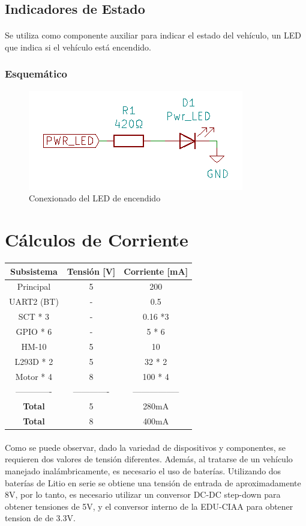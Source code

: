 \subsection{Indicadores de Estado}

\paragraph{}Se utiliza como componente auxiliar para indicar el estado del vehículo, un LED que indica si el vehículo está encendido.

\subsubsection{Esquemático}

\begin{figure}[H]
	\centering
	\includegraphics[width=0.4\linewidth]{informe_3/schem_pwr_led.png}
	\caption{Conexionado del LED de encendido}
	\label{fig:schempwrled}
\end{figure}

\section{Cálculos de Corriente}

\begin{longtable}[]{|c|c|c|}
	\toprule
	Subsistema & Tensión {[}V{]} & Corriente {[}mA{]}\tabularnewline
	\midrule
	\endhead
	Principal & 5 & 200\tabularnewline
	UART2 (BT) & - & 0.5\tabularnewline
	SCT * 3 & - & 0.16 *3\tabularnewline
	GPIO * 6 & - & 5 * 6\tabularnewline
	HM-10 & 5 & 10\tabularnewline
	L293D * 2 & 5 & 32 * 2\tabularnewline
	Motor * 4 & 8 & 100 * 4\tabularnewline
	------------- & ------------- & -----------------\tabularnewline
	\textbf{Total} & 5 & 280mA\tabularnewline
	\textbf{Total} & 8 & 400mA\tabularnewline
	\bottomrule
\end{longtable}

\paragraph{}Como se puede observar, dado la variedad de dispositivos y componentes,
se requieren dos valores de tensión diferentes. Además, al tratarse de un vehículo
manejado inalámbricamente, es necesario el uso de baterías. Utilizando dos baterías de Litio en serie 
se obtiene una tensión de entrada de aproximadamente 8V, por lo tanto, es necesario utilizar un conversor DC-DC 
step-down para obtener tensiones de 5V, y el conversor interno de la EDU-CIAA para obtener tension de de 3.3V.

